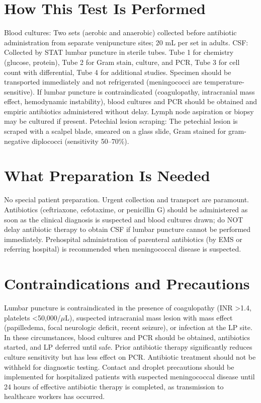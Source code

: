 \section*{How This Test Is Performed}
Blood cultures: Two sets (aerobic and anaerobic) collected before antibiotic administration from separate venipuncture sites; 20 mL per set in adults. CSF: Collected by STAT lumbar puncture in sterile tubes. Tube 1 for chemistry (glucose, protein), Tube 2 for Gram stain, culture, and PCR, Tube 3 for cell count with differential, Tube 4 for additional studies. Specimen should be transported immediately and not refrigerated (meningococci are temperature-sensitive). If lumbar puncture is contraindicated (coagulopathy, intracranial mass effect, hemodynamic instability), blood cultures and PCR should be obtained and empiric antibiotics administered without delay. Lymph node aspiration or biopsy may be cultured if present. Petechial lesion scraping: The petechial lesion is scraped with a scalpel blade, smeared on a glass slide, Gram stained for gram-negative diplococci (sensitivity 50--70\%).

\section*{What Preparation Is Needed}
No special patient preparation. Urgent collection and transport are paramount. Antibiotics (ceftriaxone, cefotaxime, or penicillin G) should be administered as soon as the clinical diagnosis is suspected and blood cultures drawn; do NOT delay antibiotic therapy to obtain CSF if lumbar puncture cannot be performed immediately. Prehospital administration of parenteral antibiotics (by EMS or referring hospital) is recommended when meningococcal disease is suspected.

\section*{Contraindications and Precautions}
Lumbar puncture is contraindicated in the presence of coagulopathy (INR >1.4, platelets <50,000/$\mu$L), suspected intracranial mass lesion with mass effect (papilledema, focal neurologic deficit, recent seizure), or infection at the LP site. In these circumstances, blood cultures and PCR should be obtained, antibiotics started, and LP deferred until safe. Prior antibiotic therapy significantly reduces culture sensitivity but has less effect on PCR. Antibiotic treatment should not be withheld for diagnostic testing. Contact and droplet precautions should be implemented for hospitalized patients with suspected meningococcal disease until 24 hours of effective antibiotic therapy is completed, as transmission to healthcare workers has occurred.

